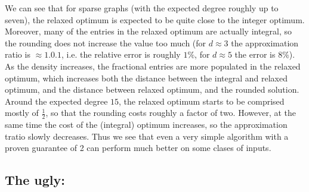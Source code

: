 \begin{center}
\end{center}

\noindent
We can see that for sparse graphs (with the expected degree roughly up to seven), the relaxed optimum is 
expected to be quite close to the integer optimum. Moreover, many of the entries in the relaxed optimum are actually
integral, so the rounding does not increase the value too much (for $d\approx3$ the approximation ratio
is $\approx1.0.1$, i.e. the relative error is roughly $1\%$, for $d\approx5$ the error is $8\%$). As the
density increases, the fractional entries are more populated in the relaxed optimum, which increases both 
the distance between the integral and relaxed optimum, and the distance between relaxed optimum, and the 
rounded solution. Around the expected degree $15$, the relaxed optimum starts to be comprised mostly 
of  $\frac{1}{2}$, so that the rounding costs roughly a factor of two. However, at the same time the
cost of the (integral) optimum increases, so the approximation tratio slowly decreases. 
Thus we see that even a very simple algorithm with a proven guarantee of 2 can perform much better
on some clases of inputs.

\subsection*{The ugly: \maxis}


